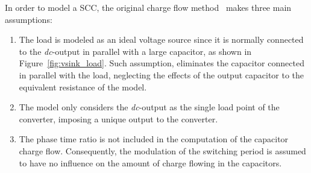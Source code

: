 In order to model a SCC, the original charge flow method~\cite{95Makowski} makes three main assumptions:
\begin{enumerate}
  \item The load is modeled as an ideal voltage source since it is normally connected to the \emph{dc}-output in parallel with a large capacitor, as shown in Figure~\ref{fig:vsink_load}. Such assumption, eliminates the capacitor connected in parallel with the load, neglecting the effects of the output capacitor to the equivalent resistance of the model.

  \item The model only considers the \emph{dc}-output as the single load point of the converter, imposing a unique output to the converter.

  \item The phase time ratio is not included in the computation of the capacitor charge flow. Consequently, the modulation of the switching period is assumed to have no influence on the amount of charge flowing in the capacitors.
\end{enumerate}

